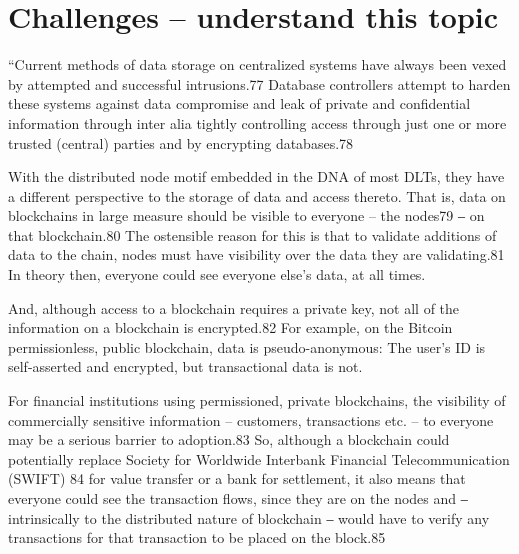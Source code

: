 
\section{Challenges -- understand this topic}
``Current methods of data storage on centralized systems have always been vexed by attempted and successful intrusions.77 Database controllers attempt to harden these systems against data compromise and leak of private and confidential information through inter alia tightly controlling access through just one or more trusted (central) parties and by encrypting databases.78

With the distributed node motif embedded in the DNA of most DLTs, they have a different perspective to the storage of data and access thereto. That is, data on blockchains in large measure should be visible to everyone – the nodes79 ‒ on that blockchain.80 The ostensible reason for this is that to validate additions of data to the chain, nodes must have visibility over the data they are validating.81 In theory then, everyone could see everyone else’s data, at all times.

And, although access to a blockchain requires a private key, not all of the information on a blockchain is encrypted.82 For example, on the Bitcoin permissionless, public blockchain, data is pseudo-anonymous: The user’s ID is self-asserted and encrypted, but transactional data is not.

For financial institutions using permissioned, private blockchains, the visibility of commercially sensitive information – customers, transactions etc. – to everyone may be a serious barrier to adoption.83 So, although a blockchain could potentially replace Society for Worldwide Interbank Financial Telecommunication (SWIFT) 84 for value transfer or a bank for settlement, it also means that everyone could see the transaction flows, since they are on the nodes and ‒ intrinsically to the distributed nature of blockchain ‒ would have to verify any transactions for that transaction to be placed on the block.85

